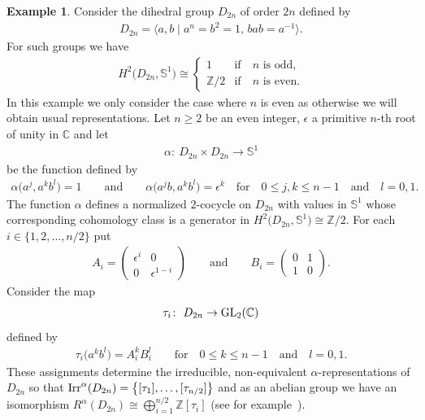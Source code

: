 \documentclass[10pt,a4paper]{amsart}
\def\Z{\mathbb{Z}}
\def\S{\mathbb{S}}
\def\C{\mathbb{C}}
\DeclareMathOperator{\Irr}{\textup{Irr}}
\theoremstyle{definition}
\newtheorem{Ex}[Th]{Example}
\numberwithin{equation}{section}
\begin{document}
\begin{Ex}\label{ej,D2n}
Consider the dihedral group $D_{2n}$ of order $2n$ defined by
\begin{gather*}
D_{2n}=\big\langle a,b\mid a^{n}=b^{2}=1,\, bab=a^{-1}\big\rangle.
\end{gather*}
For such groups we have
\begin{gather*}
H^{2}\big(D_{2n},\S^{1}\big)\cong
\begin{cases}
1 &\text{if}\quad n \text{ is odd},
\\
\Z/2 & \text{if}\quad n \text{ is even}.
\end{cases}
\end{gather*}
In this example we only consider the case where $n$ is even as otherwise we will obtain
usual representations. Let $n\geq 2$ be an even integer, $\epsilon$ a primitive $n$-th root of
unity in $\C$ and let
\begin{gather*}
\alpha\colon\ D_{2n}\times D_{2n}\rightarrow \S^{1}
\end{gather*}
be the function defined by
\begin{gather*}
\alpha\big(a^{j},a^{k}b^{l}\big)=1 \qquad \text{and} \qquad
\alpha\big(a^{j}b,a^{k}b^{l}\big)=\epsilon^{k}\quad \text{for}\quad
0\leq j,k\leq n-1 \quad \text{and}\quad l=0,1.
\end{gather*}
The function $\alpha$ defines a normalized $2$-cocycle on $D_{2n}$ with values in $\S^{1}$ whose
corresponding cohomology class is a generator in $H^{2}\big(D_{2n},\S^{1}\big)\cong \Z/2$.
For each $i\in\{1,2,\dots,n/2\}$ put
\begin{gather*}
A_{i}=\begin{pmatrix}
\epsilon^{i} & 0 \\
0 & \epsilon^{1-i}
\end{pmatrix}
\qquad \text{and} \qquad
B_{i}=\begin{pmatrix}
0 & 1\\
1 &0
\end{pmatrix}\!.
\end{gather*}
Consider the map
\begin{gather*}
\tau_{i}\colon\ D_{2n}\rightarrow {\rm GL}_{2}(\C)
\end{gather*}
defined by
\begin{gather*}
\tau_{i}\big(a^{k}b^{l}\big)=A_{i}^{k}B_{i}^{l} \qquad \text{for} \quad 0\leq k\leq n-1 \quad
\text{and}\quad l=0,1.
\end{gather*}
These assignments determine the irreducible, non-equivalent $\alpha$-representations of $D_{2n}$
so that $\Irr^{\alpha}(D_{2n})=\big\{[\tau_{1}],\dots, [\tau_{n/2}]\big\}$ and as an abelian group we
have an isomorphism $R^{\alpha}(D_{2n})\cong \bigoplus_{i=1}^{n/2}\Z[\tau_{i}]$
(see for example~\cite[Chapter 5, Theorem 7.1]{Karpilovsky3}).
\end{Ex}
\end{document}
